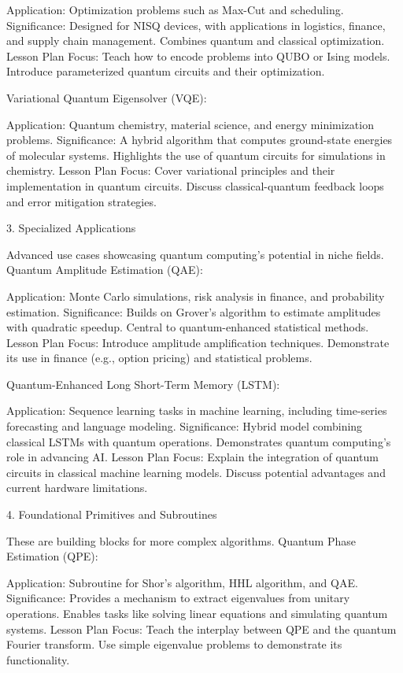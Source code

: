     Application: Optimization problems such as Max-Cut and scheduling.
    Significance:
        Designed for NISQ devices, with applications in logistics, finance, and supply chain management.
        Combines quantum and classical optimization.
    Lesson Plan Focus:
        Teach how to encode problems into QUBO or Ising models.
        Introduce parameterized quantum circuits and their optimization.

Variational Quantum Eigensolver (VQE):

    Application: Quantum chemistry, material science, and energy minimization problems.
    Significance:
        A hybrid algorithm that computes ground-state energies of molecular systems.
        Highlights the use of quantum circuits for simulations in chemistry.
    Lesson Plan Focus:
        Cover variational principles and their implementation in quantum circuits.
        Discuss classical-quantum feedback loops and error mitigation strategies.

3. Specialized Applications

Advanced use cases showcasing quantum computing’s potential in niche fields.
Quantum Amplitude Estimation (QAE):

    Application: Monte Carlo simulations, risk analysis in finance, and probability estimation.
    Significance:
        Builds on Grover’s algorithm to estimate amplitudes with quadratic speedup.
        Central to quantum-enhanced statistical methods.
    Lesson Plan Focus:
        Introduce amplitude amplification techniques.
        Demonstrate its use in finance (e.g., option pricing) and statistical problems.

Quantum-Enhanced Long Short-Term Memory (LSTM):

    Application: Sequence learning tasks in machine learning, including time-series forecasting and language modeling.
    Significance:
        Hybrid model combining classical LSTMs with quantum operations.
        Demonstrates quantum computing’s role in advancing AI.
    Lesson Plan Focus:
        Explain the integration of quantum circuits in classical machine learning models.
        Discuss potential advantages and current hardware limitations.

4. Foundational Primitives and Subroutines

These are building blocks for more complex algorithms.
Quantum Phase Estimation (QPE):

    Application: Subroutine for Shor’s algorithm, HHL algorithm, and QAE.
    Significance:
        Provides a mechanism to extract eigenvalues from unitary operations.
        Enables tasks like solving linear equations and simulating quantum systems.
    Lesson Plan Focus:
        Teach the interplay between QPE and the quantum Fourier transform.
        Use simple eigenvalue problems to demonstrate its functionality.

